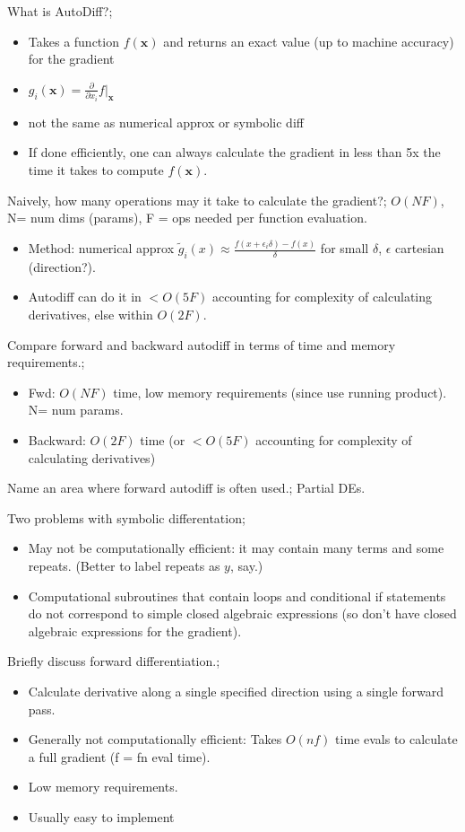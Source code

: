 \documentclass{article}
\begin{document}
What is AutoDiff?; \begin{itemize} \item Takes a function $f(\mathbf{x})$ and returns an exact value (up to machine accuracy) for the gradient \item $g_i(\mathbf{x})=\frac{\partial}{\partial x_i}f\vert_{\mathbf{x}}$ \item not the same as numerical approx or symbolic diff \item If done efficiently, one can always calculate the gradient in less than 5x the time it takes to compute $f(\mathbf{x})$.  \end{itemize}

Naively, how many operations may it take to calculate the gradient?; $O(NF)$, N= num dims (params), F = ops needed per function evaluation. \begin{itemize} \item Method: numerical approx $\tilde{g}_i(x) \approx \frac{f(x+\epsilon_i \delta)-f(x)}{\delta}$ for small $\delta$, $\epsilon$ cartesian (direction?).  \item Autodiff can do it in $<O(5F)$ accounting for complexity of calculating derivatives, else within $O(2F)$.  \end{itemize} 

Compare forward and backward autodiff in terms of time and memory requirements.; \begin{itemize} \item Fwd: $O(NF)$ time, low memory requirements (since use running product). N= num params.  \item Backward: $O(2F)$ time (or $<O(5F)$ accounting for complexity of calculating derivatives) \end{itemize} 

Name an area where forward autodiff is often used.; Partial DEs.

Two problems with symbolic differentation; \begin{itemize} \item May not be computationally efficient: it may contain many terms and some repeats. (Better to label repeats as $y$, say.) \item Computational subroutines that contain loops and conditional if statements do not correspond to simple closed algebraic expressions (so don't have closed algebraic expressions for the gradient).  \end{itemize}

Briefly discuss forward differentiation.; \begin{itemize} \item Calculate derivative along a single specified direction using a single forward pass.  \item Generally not computationally efficient: Takes $O(nf)$ time evals to calculate a full gradient (f = fn eval time).  \item Low memory requirements.  \item Usually easy to implement \end{itemize}
\end{document}
